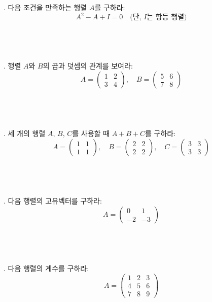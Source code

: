 \documentclass[fleqn]{article}
\begin{document}
. 다음 조건을 만족하는 행렬 \(A\)를 구하라:  
\[
A^2 - A + I = 0 \quad \text{(단, \(I\)는 항등 행렬)}
\]\\\\\\\\

. 행렬 \(A\)와 \(B\)의 곱과 덧셈의 관계를 보여라:  
\[
A = \begin{pmatrix} 1 & 2 \\ 3 & 4 \end{pmatrix}, \quad B = \begin{pmatrix} 5 & 6 \\ 7 & 8 \end{pmatrix}
\]\\\\\\\\

. 세 개의 행렬 \(A\), \(B\), \(C\)를 사용할 때 \(A + B + C\)를 구하라:  
\[
A = \begin{pmatrix} 1 & 1 \\ 1 & 1 \end{pmatrix}, \quad B = \begin{pmatrix} 2 & 2 \\ 2 & 2 \end{pmatrix}, \quad C = \begin{pmatrix} 3 & 3 \\ 3 & 3 \end{pmatrix}
\]\\\\\\\\

. 다음 행렬의 고유벡터를 구하라:  
\[
A = \begin{pmatrix} 0 & 1 \\ -2 & -3 \end{pmatrix}
\]\\\\\\\\

. 다음 행렬의 계수를 구하라:  
\[
A = \begin{pmatrix} 1 & 2 & 3 \\ 4 & 5 & 6 \\ 7 & 8 & 9 \end{pmatrix}
\]\\\\\\\\
\end{document}
